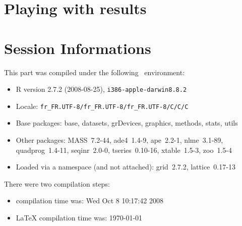 \documentclass{article}
\begin{document}
\section{Playing with results}



\section*{Session Informations}

This part was compiled under the following \Rlogo{}~environment:

\begin{itemize}
  \item R version 2.7.2 (2008-08-25), \verb|i386-apple-darwin8.8.2|
  \item Locale: \verb|fr_FR.UTF-8/fr_FR.UTF-8/fr_FR.UTF-8/C/C/C|
  \item Base packages: base, datasets, grDevices, graphics, methods,
    stats, utils
  \item Other packages: MASS~7.2-44, ade4~1.4-9, ape~2.2-1,
    nlme~3.1-89, quadprog~1.4-11, seqinr~2.0-0, tseries~0.10-16,
    xtable~1.5-3, zoo~1.5-4
  \item Loaded via a namespace (and not attached): grid~2.7.2,
    lattice~0.17-13
\end{itemize}
There were two compilation steps:

\begin{itemize}
  \item \Rlogo{} compilation time was: Wed Oct  8 10:17:42 2008
  \item \LaTeX{} compilation time was: \today
\end{itemize}


\clearpage
{}


\end{document}
